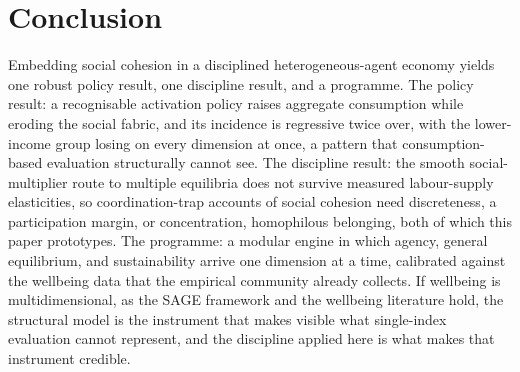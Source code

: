 \documentclass[11pt]{article}
\begin{document}
\section{Conclusion}

Embedding social cohesion in a disciplined heterogeneous-agent economy yields one robust policy result, one discipline result, and a programme. The policy result: a recognisable activation policy raises aggregate consumption while eroding the social fabric, and its incidence is regressive twice over, with the lower-income group losing on every dimension at once, a pattern that consumption-based evaluation structurally cannot see. The discipline result: the smooth social-multiplier route to multiple equilibria does not survive measured labour-supply elasticities, so coordination-trap accounts of social cohesion need discreteness, a participation margin, or concentration, homophilous belonging, both of which this paper prototypes. The programme: a modular engine in which agency, general equilibrium, and sustainability arrive one dimension at a time, calibrated against the wellbeing data that the empirical community already collects. If wellbeing is multidimensional, as the SAGE framework and the wellbeing literature hold, the structural model is the instrument that makes visible what single-index evaluation cannot represent, and the discipline applied here is what makes that instrument credible.



\end{document}
